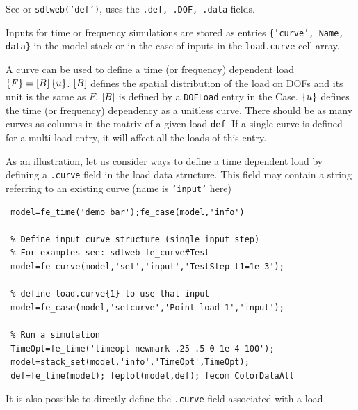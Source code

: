 
See  or {\tt sdtweb('def')}, uses the {\tt .def, .DOF, .data} fields. 


Inputs for time or frequency simulations are stored as entries {\tt \{'curve', Name, data\}} in the model stack or in the case of inputs in the {\tt load.curve} cell array. 

A curve can be used to define a time (or frequency) dependent load $\left\{F\right\}=\left[B\right]\left\{u\right\}$. $\left[B\right]$ defines the spatial distribution of the load on DOFs and its unit is the same as $F$. $\left[B\right]$ is defined by a {\tt DOFLoad} entry in the Case. $\left\{u\right\}$ defines the time (or frequency) dependency as a unitless curve. There should be as many curves as columns in the matrix of a given load {\tt def}. If a single curve is defined for a multi-load entry, it will affect all the loads of this entry.

As an illustration, let us consider ways to define a time dependent load by defining a {\tt .curve} field in the load data structure. This field may contain a string referring to an existing curve (name is {\tt 'input'} here)

\begin{verbatim}
 model=fe_time('demo bar');fe_case(model,'info')

 % Define input curve structure (single input step) 
 % For examples see: sdtweb fe_curve#Test 
 model=fe_curve(model,'set','input','TestStep t1=1e-3');

 % define load.curve{1} to use that input
 model=fe_case(model,'setcurve','Point load 1','input');

 % Run a simulation
 TimeOpt=fe_time('timeopt newmark .25 .5 0 1e-4 100');
 model=stack_set(model,'info','TimeOpt',TimeOpt);
 def=fe_time(model); feplot(model,def); fecom ColorDataAll
\end{verbatim}%


%


It is also possible to directly define the {\tt .curve} field associated with a load

